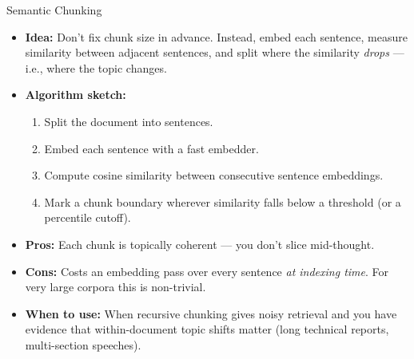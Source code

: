 \begin{frame}{Semantic Chunking}
\begin{itemize}
\item \textbf{Idea:} Don't fix chunk size in advance. Instead, embed each sentence, measure similarity between adjacent sentences, and split where the similarity \emph{drops} --- i.e., where the topic changes.

\medskip
\item \textbf{Algorithm sketch:}
\begin{enumerate}
    \item Split the document into sentences.
    \item Embed each sentence with a fast embedder.
    \item Compute cosine similarity between consecutive sentence embeddings.
    \item Mark a chunk boundary wherever similarity falls below a threshold (or a percentile cutoff).
\end{enumerate}

\medskip
\item \textbf{Pros:} Each chunk is topically coherent --- you don't slice mid-thought.

\medskip
\item \textbf{Cons:} Costs an embedding pass over every sentence \emph{at indexing time}. For very large corpora this is non-trivial.

\medskip
\item \textbf{When to use:} When recursive chunking gives noisy retrieval and you have evidence that within-document topic shifts matter (long technical reports, multi-section speeches).
\end{itemize}
\end{frame}

